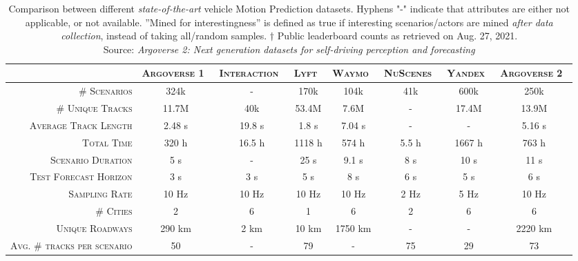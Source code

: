\begin{table}[!tpbh]
	\caption[Comparison between different \textit{state-of-the-art} vehicle Motion Prediction datasets]{Comparison between different \textit{state-of-the-art} vehicle Motion Prediction datasets. Hyphens "-" indicate that attributes are either not applicable, or not available. ''Mined for interestingness'' is defined as true if interesting scenarios/actors are mined \textit{after data collection}, instead of taking all/random samples. $\dagger$ Public leaderboard counts as retrieved on Aug. 27, 2021. \\
	Source: \textit{Argoverse 2: Next generation datasets for self-driving perception and forecasting} \cite{wilson2023argoverse}}
	
	\label{table:2_motion_prediction_datasets_comparison}
	\centering
	\begin{adjustbox}{max width=\columnwidth}
		\begingroup
		\renewcommand{\arraystretch}{1.25} %
		\begin{tabular}{rccccccc}
			\toprule
			& \textsc{Argoverse 1}~\cite{chang2019argoverse} & \textsc{Interaction}~\cite{zhan2019interaction} & \textsc{Lyft}~\cite{john2020one} & \textsc{Waymo}~\cite{ettinger2021large} & \textsc{NuScenes}~\cite{caesar2020nuscenes} & \textsc{Yandex}~\cite{malinin2021shifts} & \textsc{Argoverse 2}~\cite{wilson2023argoverse} \\
			\midrule
			\textsc{\# Scenarios} & 324k & - & 170k & 104k & 41k & 600k & 250k \\
			\textsc{\# Unique Tracks} & 11.7M  & 40k & 53.4M & 7.6M & - & 17.4M & 13.9M  \\
			\textsc{Average Track Length} & 2.48 s & 19.8 s & 1.8 s & 7.04 s & - & - & 5.16 s  \\
			\textsc{Total Time} & 320 h & 16.5 h & 1118 h & 574 h & 5.5 h & 1667 h & 763 h \\
			\textsc{Scenario Duration} & 5 s & - & 25 s & 9.1 s & 8 s & 10 s & 11 s \\
			\textsc{Test Forecast Horizon} & 3 s & 3 s & 5 s & 8 s & 6 s & 5 s & 6 s \\
			\textsc{Sampling Rate} & 10 Hz & 10 Hz & 10 Hz & 10 Hz & 2 Hz & 5 Hz & 10 Hz \\
			\textsc{\# Cities} & 2 & 6 & 1 & 6 & 2 & 6 & 6  \\
			\textsc{Unique Roadways} & 290 km & 2 km & 10 km & 1750 km & - & - & 2220 km \\
			\textsc{Avg. \# tracks per scenario} & 50 & - & 79 & - & 75 & 29 & 73\\

\end{tabular}
\end{adjustbox}
\end{table}

